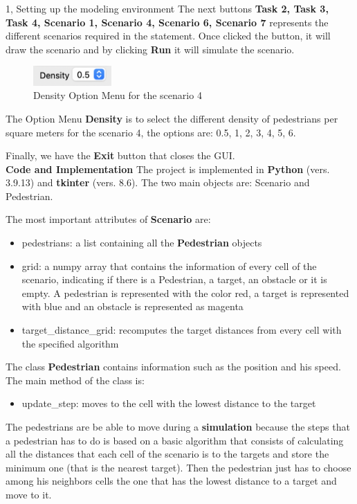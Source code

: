 \documentclass[10pt,a4paper]{article}
\begin{document}
\begin{task}{1, Setting up the modeling environment}
The next buttons \textbf{Task 2, Task 3, Task 4, Scenario 1, Scenario 4, Scenario 6, Scenario 7} represents the different scenarios required in the statement. Once clicked the button, it will draw the scenario and by clicking \textbf{Run} it will simulate the scenario.

\begin{figure}[h]
    \includegraphics[width=3cm]{density}
    \centering
    \caption{Density Option Menu for the scenario 4}
    \label{density}
\end{figure}

The Option Menu \textbf{Density} is to select the different density of pedestrians per square meters for the scenario 4, the options are: 0.5, 1, 2, 3, 4, 5, 6.

Finally, we have the \textbf{Exit} button that closes the GUI.\\
\textbf{Code and Implementation} The project is implemented in \textbf{Python} (vers. 3.9.13) and \textbf{tkinter} (vers. 8.6). The two main objects are: Scenario and Pedestrian.

The most important attributes of \textbf{Scenario} are:

\begin{itemize}
    \item pedestrians: a list containing all the \textbf{Pedestrian} objects
    \item grid: a numpy array that contains the information of every cell of the scenario, indicating if there is a Pedestrian, a target, an obstacle or it is empty. A pedestrian is represented with the color red, a target is represented with blue and an obstacle is represented as magenta
    \item target\_distance\_grid: recomputes the target distances from every cell with the specified algorithm 
\end{itemize}

The class \textbf{Pedestrian} contains information such as the position and his speed. The main method of the class is:
\begin{itemize}
    \item update\_step: moves to the cell with the lowest distance to the target
\end{itemize}

The pedestrians are be able to move during a \textbf{simulation} because the steps that a pedestrian has to do is based on a basic algorithm that consists of calculating all the distances that each cell of the scenario is to the targets and store the minimum one (that is the nearest target). Then the pedestrian just has to choose among his neighbors cells the one that has the lowest distance to a target and move to it. 

\end{task}
\end{document}
